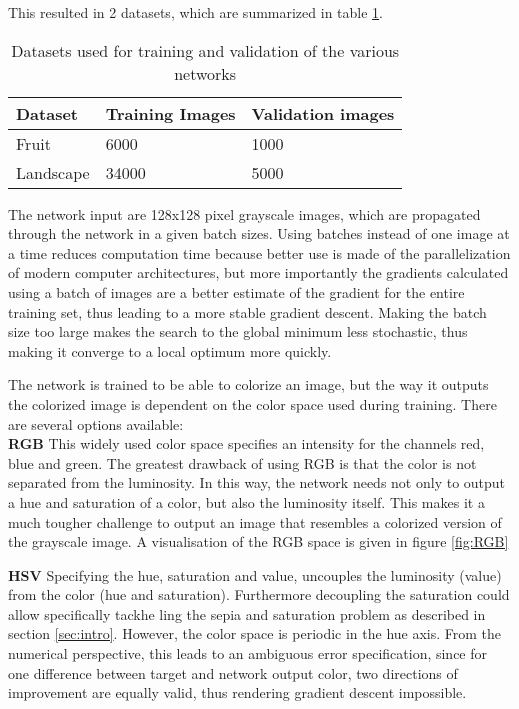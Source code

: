 This resulted in 2 datasets, which are summarized in table \ref{tab:dataset}.

\begin{table}[h!]
	\centering
	\caption{Datasets used for training and validation of the various networks}
	\label{tab:dataset}
	\begin{tabular}{|l|l|l|}
		\hline
		Dataset   & Training Images & Validation images \\ \hline
		Fruit     & 6000            & 1000              \\ \hline
		Landscape & 34000           & 5000              \\ \hline
	\end{tabular}
\end{table}

The network input are 128x128 pixel grayscale images, which are propagated through the network in a given batch sizes. Using batches instead of one image at a time reduces computation time because better use is made of the parallelization of modern computer architectures, but more importantly the gradients calculated using a batch of images are a better estimate of the gradient for the entire training set, thus leading to a more stable gradient descent\cite{ioffe2015batch}. Making the batch size too large makes the search to the global minimum less stochastic, thus making it converge to a local optimum more quickly.

The network is trained to be able to colorize an image, but the way it outputs the colorized image is dependent on the color space used during training. There are several options available:\\

\textbf{RGB} This widely used color space specifies an intensity for the channels red, blue and green. The greatest drawback of using RGB is that the color is not separated from the luminosity. In this way, the network needs not only to output a hue and saturation of a color, but also the luminosity itself. This makes it a much tougher challenge to output an image that resembles a colorized version of the grayscale image. A visualisation of the RGB space is given in figure \ref{fig:RGB}

\textbf{HSV} Specifying the hue, saturation and value, uncouples the luminosity (value) from the color (hue and saturation). Furthermore decoupling the saturation could allow specifically tackhe ling the sepia and saturation problem as described in section \ref{sec:intro}. However, the color space is periodic in the hue axis. From the numerical perspective, this leads to an ambiguous error specification, since for one difference between target and network output color, two directions of improvement are equally valid, thus rendering gradient descent impossible.

